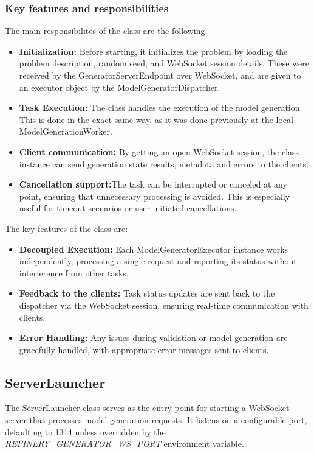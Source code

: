 		\subsubsection{Key features and responsibilities}\label{Key features and responsibilites}
			The main responsibilites of the class are the following:
			\begin{itemize}
				\item \textbf{Initialization:} Before starting, it initializes the problem by loading the problem description, random seed, and WebSocket session details. These were
				received by the GeneratorServerEndpoint over WebSocket, and are given to an executor object by the ModelGeneratorDispatcher.
				\item \textbf{Task Execution:} The class handles the execution of the model generation. This is done in the exact same way, as it was done previously at the local ModelGenerationWorker.
				\item \textbf{Client communication:} By getting an open WebSocket session, the class instance can send generation state results, metadata and errors to the clients.
				\item \label{serverexecutorcancel}\textbf{Cancellation support:}The task can be interrupted or canceled at any point, ensuring that unnecessary processing is avoided. This is especially useful for timeout scenarios or user-initiated cancellations.
			\end{itemize}
			The key features of the class are:
			\begin{itemize}
				\item \textbf{Decoupled Execution:} Each ModelGeneratorExecutor instance works independently, processing a single request and reporting its status without interference from other tasks.
				\item \textbf{Feedback to the clients:} Task status updates are sent back to the dispatcher via the WebSocket session, ensuring real-time communication with clients.
				\item \textbf{Error Handling:} Any issues during validation or model generation are gracefully handled, with appropriate error messages sent to clients.
			\end{itemize}

		\subsection{ServerLauncher}\label{Serverlauncher}
		The ServerLauncher class serves as the entry point for starting a WebSocket server that 
		processes model generation requests. It listens on a configurable port, defaulting to 1314 
		unless overridden by the \textit{REFINERY\_GENERATOR\_WS\_PORT} environment variable. 
		
